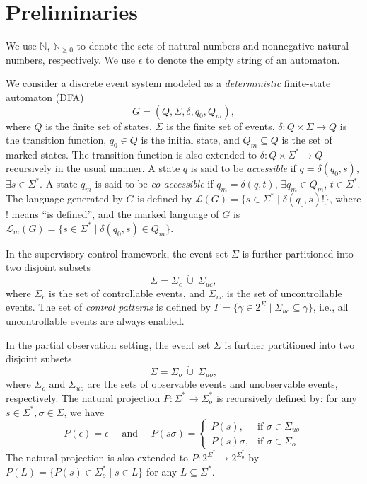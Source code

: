 \documentclass[twocolumn]{autart}
\begin{document}
\newpage

\section{Preliminaries}\label{sec:prelimi}
 
We use $\mathbb{N}$, $\mathbb{N}_{\geq 0}$ to denote the sets of natural numbers and nonnegative natural numbers, respectively. 
We use $\epsilon$ to denote the empty string of an automaton. 
 

We consider a discrete event system  modeled as a \emph{deterministic} finite-state automaton (DFA)  
    $$
        G = (Q, \Sigma, \delta, q_0, Q_m),
    $$
    where
    $Q$ is the finite set of states, 
    $\Sigma$ is the finite set of events, 
    $\delta: Q \times \Sigma \to Q$ is the   transition function,
    $q_0\in Q$ is the initial state, 
    and $Q_m\subseteq Q$ is the set of marked states. 
The transition function is also extended to 
$\delta:Q\times \Sigma^* \to Q$ recursively in the usual manner. 
%
A state $q$ is said to be \emph{accessible} if $q = \delta(q_0, s)$, $\exists s \in \Sigma^*$.
A state $q_m$ is said to be \emph{co-accessible} if $q_m = \delta(q, t)$, $\exists q_m \in Q_m$, $t \in \Sigma^*$.
%
The language generated by $G$ is defined by 
$\mathcal{L}(G) = \{ s \in \Sigma^* \mid \delta(q_0, s)! \}$, where $!$ means ``is defined'', and the marked language of $G$ is 
$\mathcal{L}_m(G) = \{ s \in \Sigma^* \mid \delta(q_0, s) \in Q_m \}$. 

In the supervisory control framework, 
the event set $\Sigma$ is further partitioned into two disjoint subsets
$$
\Sigma = \Sigma_c \ \dot{\cup} \ \Sigma_{uc},
$$
where $\Sigma_c$ is the set of controllable events, and $\Sigma_{uc}$ is the set of uncontrollable events. 
The set of \emph{control patterns} is defined by $\Gamma = \{\gamma\in 2^\Sigma \mid \Sigma_{uc}\subseteq \gamma \}$,  i.e., all uncontrollable events are always enabled. 


In the partial observation setting, the event set $\Sigma$ is further  partitioned into two disjoint subsets 
$$
\Sigma = \Sigma_o \ \dot{\cup} \ \Sigma_{uo},
$$
where $\Sigma_o$ and $\Sigma_{uo}$ are the sets of observable events and unobservable events, respectively. 
The natural projection $P : \Sigma^* \rightarrow \Sigma_{o}^*$ is recursively defined by: for any $s\in\Sigma^*,\sigma\in\Sigma$, we have
\begin{equation}
P(\epsilon)  = \epsilon\quad \text{ and }\quad 
P(s \sigma) =
\begin{cases}
P(s), & \text{if } \sigma \in \Sigma_{uo} \\
P(s)\sigma,  & \text{if } \sigma \in \Sigma_{o}
\end{cases}
\label{eq:proj}
\end{equation} 
The natural projection is also extended to $P:2^{\Sigma^*}\to 2^{\Sigma_o^*}$ by $P(L)=\{P(s)\in \Sigma_o^* \mid s\in L\}$  for any $L\subseteq\Sigma^*$. 
    
\end{document}
